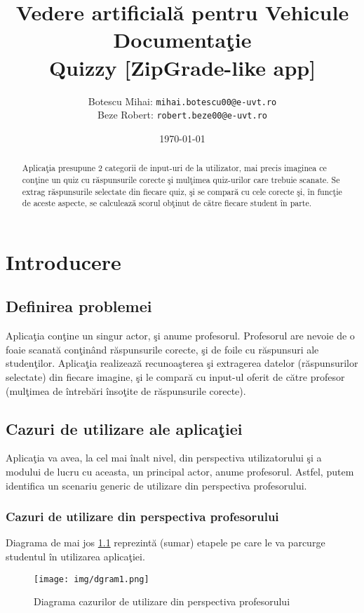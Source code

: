 \documentclass{report}
\title{Vedere artificial\u a pentru Vehicule \\ Documenta\c tie \\ Quizzy [ZipGrade-like app]}
\author{Botescu Mihai: \texttt{mihai.botescu00@e-uvt.ro} \\ Beze Robert: \texttt{robert.beze00@e-uvt.ro}}
\date{\today}
\begin{document}
\maketitle
\begin{abstract}
    Aplica\c tia presupune 2 categorii de input-uri de la utilizator, mai precis imaginea ce con\c tine un quiz cu r\u aspunsurile corecte \c si mul\c timea quiz-urilor care trebuie scanate. Se extrag r\u aspunsurile selectate din fiecare quiz, \c si se compar\u a cu cele corecte \c si, în func\c tie de aceste aspecte, se calculeaz\u a scorul ob\c tinut de c\u atre fiecare student în parte.
\end{abstract}
\tableofcontents
\chapter{Introducere}
\section{Definirea problemei}
Aplica\c tia con\c tine un singur actor, \c si anume profesorul. Profesorul are nevoie de o foaie scanat\u a con\c tinând r\u aspunsurile corecte, \c si de foile cu r\u aspunsuri ale studen\c tilor. 
Aplica\c tia realizeaz\u a recunoa\c sterea \c si extragerea datelor (r\u aspunsurilor selectate) din fiecare imagine, \c si le compar\u a cu input-ul oferit de c\u atre profesor (mul\c timea de întreb\u ari înso\c tite de r\u aspunsurile corecte).
 

\section{Cazuri de utilizare ale aplica\c tiei}
Aplica\c tia va avea, la cel mai înalt nivel, din perspectiva utilizatorului \c si a modului de lucru cu aceasta, un principal actor, anume profesorul.
Astfel, putem identifica un scenariu generic de utilizare din perspectiva profesorului.

\subsection{Cazuri de utilizare din perspectiva profesorului}
Diagrama de mai jos \ref{dgram1} reprezint\u a (sumar) etapele pe care le va parcurge studentul în utilizarea aplica\c tiei.

\begin{figure}[h!]
    \centering
    \texttt{[image: img/dgram1.png]}
    \caption{Diagrama cazurilor de utilizare din perspectiva profesorului}
    \label{dgram1}
\end{figure}
\end{document}
